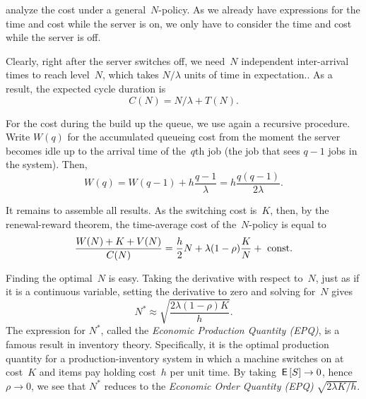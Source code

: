\documentclass[queueing-book.tex]{subfiles}
\begin{document}
 analyze the cost under a general~$N$-policy.
As we already have expressions for the time and cost while the server is on, we only have to consider the time and cost while the server is off.

Clearly, right after the server switches off, we need~$N$ independent inter-arrival times to reach level~$N$, which takes $N/\lambda$ units of time in expectation.. As a result, the expected cycle duration is
\begin{equation*}
C(N) = N/\lambda + T(N).
\end{equation*}

For the cost during the build up the queue, we use again a recursive procedure.
Write $W(q)$ for the accumulated queueing cost
from the moment the server becomes idle up to the arrival time of the~$q$th job (the job that sees $q-1$ jobs in the system).
Then,
\begin{equation*}
  W(q) = W(q-1) +  h\frac{q-1}{\lambda}= h \frac{q(q-1)}{2\lambda}.
\end{equation*}

It remains to assemble all results.
As the switching cost is~$K$, then, by the renewal-reward theorem, the time-average cost of the~$N$-policy is equal to
\begin{align*}
  \frac{W(N)+K+V(N)}{C(N)} = \frac{h}{2}N +  \lambda (1-\rho) \frac{K}{N} + \text{ const.}
\end{align*}

Finding the optimal~$N$ is easy. Taking the derivative with respect to~$N$, just as if it is a continuous variable, setting the derivative to zero and solving for~$N$ gives
\begin{equation*}
  N^* \approx \sqrt{\frac{2\lambda(1-\rho)K}{h}}.
\end{equation*}
The expression for $N^*$, called the \emph{Economic Production Quantity (EPQ)}, is a famous result in inventory theory.
Specifically, it is the optimal production quantity for a production-inventory system in which a machine switches on at cost~$K$ and items pay holding cost~$h$ per unit time.
By taking $\,\mathsf{E}\left[S\right] \to 0$, hence $\rho \to 0$, we see that $N^*$ reduces to the \emph{Economic Order Quantity (EPQ)} $\sqrt{2\lambda K/h}$.
\end{document}
